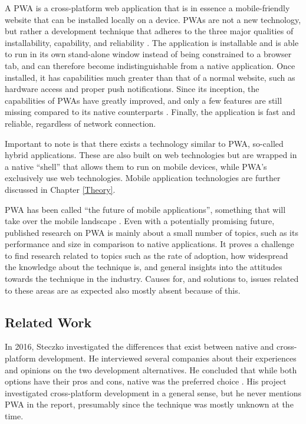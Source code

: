 \documentclass[a4paper,12pt]{article}
\begin{document}
A PWA is a cross-platform web application that is in essence a mobile-friendly website that can be installed locally on a device. PWAs are not a new technology, but rather a development technique that adheres to the three major qualities of installability, capability, and reliability \cite{whatarepwas}. The application is installable and is able to run in its own stand-alone window instead of being constrained to a browser tab, and can therefore become indistinguishable from a native application. Once installed, it has capabilities much greater than that of a normal website, such as hardware access and proper push notifications. Since its inception, the capabilities of PWAs have greatly improved, and only a few features are still missing compared to its native counterparts \cite{whatwebcando}. Finally, the application is fast and reliable, regardless of network connection.

Important to note is that there exists a technology similar to PWA, so-called hybrid applications. These are also built on web technologies but are wrapped in a native “shell” that allows them to run on mobile devices, while PWA’s exclusively use web technologies. Mobile application technologies are further discussed in Chapter \ref{Theory}.

PWA has been called “the future of mobile applications”, something that will take over the mobile landscape \cite{casestudies_mia, futureofweb_claim1}. Even with a potentially promising future, published research on PWA is mainly about a small number of topics, such as its performance and size in comparison to native applications. It proves a challenge to find research related to topics such as the rate of adoption, how widespread the knowledge about the technique is, and general insights into the attitudes towards the technique in the industry. Causes for, and solutions to, issues related to these areas are as expected also mostly absent because of this.

\subsection{Related Work}
\label{Intro_relatedWork}
In 2016, Steczko investigated the differences that exist between native and cross-platform development. He interviewed several companies about their experiences and opinions on the two development alternatives. He concluded that while both options have their pros and cons, native was the preferred choice \cite{thesis_steczko}. His project investigated cross-platform development in a general sense, but he never mentions PWA in the report, presumably since the technique was mostly unknown at the time.
\end{document}
